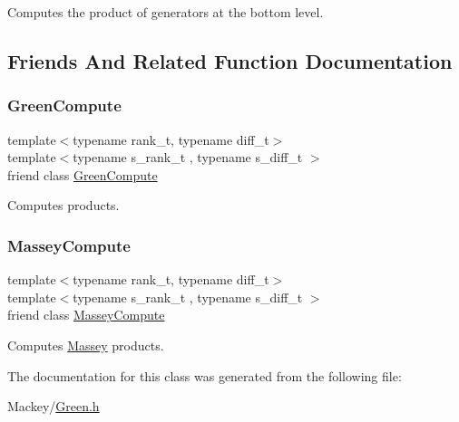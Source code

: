 Computes the product of generators at the bottom level. 

\subsection{Friends And Related Function Documentation}
\mbox{\label{classMackey_1_1internal_1_1ProductGen_a85de7c4aeeee34981e2020c2f9ddd3e2}} 
\subsubsection{\texorpdfstring{Green\+Compute}{GreenCompute}}
{\footnotesize\ttfamily template$<$typename rank\+\_\+t, typename diff\+\_\+t$>$ \\
template$<$typename s\+\_\+rank\+\_\+t , typename s\+\_\+diff\+\_\+t $>$ \\
friend class \hyperlink{classMackey_1_1internal_1_1GreenCompute}{Green\+Compute}\hspace{0.3cm}{\ttfamily [friend]}}



Computes products. 

\mbox{\label{classMackey_1_1internal_1_1ProductGen_af259bfb9b4dced17104ac8fbb697355c}} 
\subsubsection{\texorpdfstring{Massey\+Compute}{MasseyCompute}}
{\footnotesize\ttfamily template$<$typename rank\+\_\+t, typename diff\+\_\+t$>$ \\
template$<$typename s\+\_\+rank\+\_\+t , typename s\+\_\+diff\+\_\+t $>$ \\
friend class \hyperlink{classMackey_1_1internal_1_1MasseyCompute}{Massey\+Compute}\hspace{0.3cm}{\ttfamily [friend]}}



Computes \hyperlink{classMackey_1_1Massey}{Massey} products. 



The documentation for this class was generated from the following file\+:\begin{DoxyCompactItemize}
\item 
Mackey/\hyperlink{Green_8h}{Green.\+h}\end{DoxyCompactItemize}
